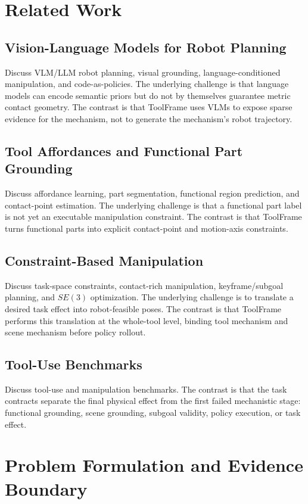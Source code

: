 \documentclass[journal]{IEEEtran}
\newcommand{\method}{ToolFrame}
\begin{document}
\section{Related Work}
\subsection{Vision-Language Models for Robot Planning}
Discuss VLM/LLM robot planning, visual grounding, language-conditioned
manipulation, and code-as-policies. The underlying challenge is that language
models can encode semantic priors but do not by themselves guarantee metric
contact geometry. The contrast is that \method{} uses VLMs to expose sparse
evidence for the mechanism, not to generate the mechanism's robot trajectory.

\subsection{Tool Affordances and Functional Part Grounding}
Discuss affordance learning, part segmentation, functional region prediction,
and contact-point estimation. The underlying challenge is that a functional
part label is not yet an executable manipulation constraint. The contrast is
that \method{} turns functional parts into explicit contact-point and
motion-axis constraints.

\subsection{Constraint-Based Manipulation}
Discuss task-space constraints, contact-rich manipulation, keyframe/subgoal
planning, and $SE(3)$ optimization. The underlying challenge is to translate a
desired task effect into robot-feasible poses. The contrast is that \method{}
performs this translation at the whole-tool level, binding tool mechanism and
scene mechanism before policy rollout.

\subsection{Tool-Use Benchmarks}
Discuss tool-use and manipulation benchmarks. The contrast is that the task
contracts separate the final physical effect from the first failed mechanistic
stage: functional grounding, scene grounding, subgoal validity, policy
execution, or task effect.

\section{Problem Formulation and Evidence Boundary}
\end{document}
